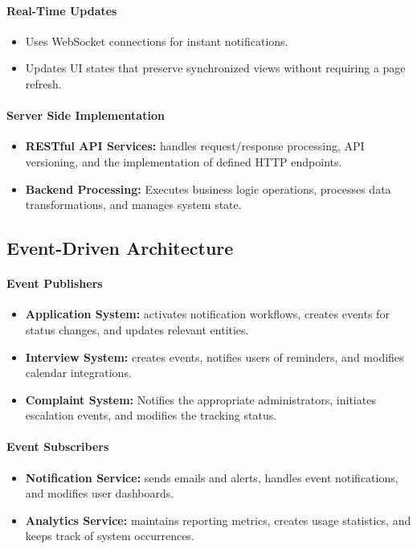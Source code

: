 \paragraph{Real-Time Updates}
\begin{itemize}
    \item Uses WebSocket connections for instant notifications.
    \item Updates UI states that preserve synchronized views without requiring a page refresh.
\end{itemize}

\paragraph{Server Side Implementation}
\begin{itemize}
    \item \textbf{RESTful API Services:} handles request/response processing, API versioning, and the implementation of defined HTTP endpoints.
    \item \textbf{Backend Processing:} Executes business logic operations, processes data transformations, and manages system state.
\end{itemize}

\subsection{Event-Driven Architecture}
\paragraph{Event Publishers}
\begin{itemize}
    \item \textbf{Application System:} activates notification workflows, creates events for status changes, and updates relevant entities.
    \item \textbf{Interview System:} creates events, notifies users of reminders, and modifies calendar integrations.
    \item \textbf{Complaint System:} Notifies the appropriate administrators, initiates escalation events, and modifies the tracking status.
\end{itemize}

\paragraph{Event Subscribers}
\begin{itemize}
    \item \textbf{Notification Service:} sends emails and alerts, handles event notifications, and modifies user dashboards.
    \item \textbf{Analytics Service:} maintains reporting metrics, creates usage statistics, and keeps track of system occurrences.
\end{itemize}

